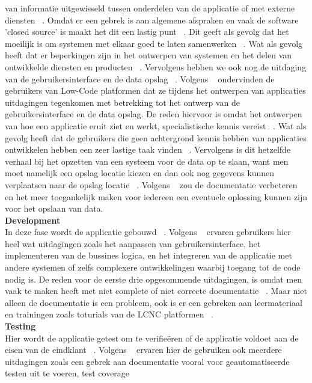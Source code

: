 van informatie uitgewisseld tussen onderdelen van de applicatie of met externe diensten ~\autocite{Rokis_2022}. Omdat er een gebrek is aan algemene afspraken en vaak de software 'closed source' is maakt het dit een lastig punt ~\autocite{Rokis_2022}. Dit geeft als gevolg dat het moeilijk is
om systemen met elkaar goed te laten samenwerken ~\autocite{Rokis_2022}. Wat als gevolg heeft dat er beperkingen zijn in het ontwerpen van systemen en het delen van ontwikkelde diensten en producten ~\autocite{Rokis_2022}.
Vervolgens hebben we ook nog de uitdaging van de gebruikersinterface en de data opslag ~\autocite{Rokis_2022}.
Volgens ~\textcite{Rokis_2022} ondervinden de gebruikers van Low-Code platformen dat ze tijdens het ontwerpen van applicaties uitdagingen tegenkomen met betrekking tot het ontwerp van de gebruikersinterface en de data opslag.
De reden hiervoor is omdat het ontwerpen van hoe een applicatie eruit ziet en werkt, specialistische kennis vereist ~\autocite{Rokis_2022}. Wat als gevolg heeft dat de gebruikers die geen achtergrond kennis hebben van applicaties ontwikkelen hebben een zeer lastige taak vinden ~\autocite{Rokis_2022}.
Vervolgens is dit hetzelfde verhaal bij het opzetten van een systeem voor de data op te slaan, want men moet namelijk een opslag locatie kiezen en dan ook nog gegevens kunnen verplaatsen naar de opslag locatie ~\autocite{Rokis_2022}.
Volgens ~\textcite{Rokis_2022} zou de documentatie verbeteren en het meer toegankelijk maken voor iedereen een eventuele oplossing kunnen zijn voor het opslaan van data.
\\
\textbf{Development}
\\
In deze fase wordt de applicatie gebouwd ~\autocite{Rokis_2022}.  Volgens ~\textcite{Rokis_2022} ervaren gebruikers hier heel wat uitdagingen zoals het aanpassen van gebruikersinterface, het implementeren van de bussines logica, en het integreren van de applicatie met andere systemen
of zelfs complexere ontwikkelingen waarbij toegang tot de code nodig is. De reden voor de eerste drie opgesommende uitdagingen, is omdat men vaak te maken heeft met niet complete of niet correcte documentatie ~\autocite{Rokis_2022}. Maar niet alleen de documentatie is een probleem,
ook is er een gebreken aan leermateriaal en trainingen zoals toturials van de LCNC platformen ~\autocite{Rokis_2022}.
\\
\textbf{Testing}
\\
Hier wordt de applicatie getest om te verifieëren of de applicatie voldoet aan de eisen van de eindklant ~\autocite{Rokis_2022}.
Volgens ~\textcite{Rokis_2022} ervaren hier de gebruiken ook meerdere uitdagingen zoals een gebrek aan documentatie vooral voor geautomatiseerde testen uit te voeren, test coverage
